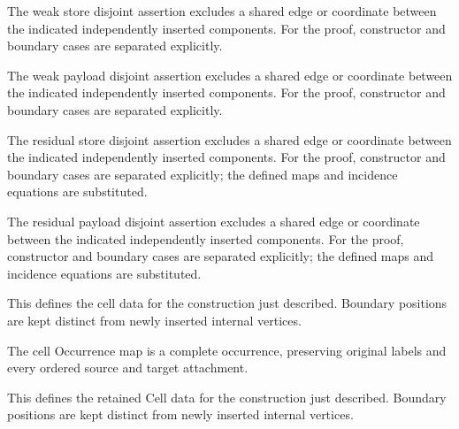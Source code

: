 The weak store disjoint assertion excludes a shared edge or coordinate between the indicated independently inserted components.
For the proof, constructor and boundary cases are separated explicitly.
\par{}

The weak payload disjoint assertion excludes a shared edge or coordinate between the indicated independently inserted components.
For the proof, constructor and boundary cases are separated explicitly.
\par{}

The residual store disjoint assertion excludes a shared edge or coordinate between the indicated independently inserted components.
For the proof, constructor and boundary cases are separated explicitly; the defined maps and incidence equations are substituted.
\par{}

The residual payload disjoint assertion excludes a shared edge or coordinate between the indicated independently inserted components.
For the proof, constructor and boundary cases are separated explicitly; the defined maps and incidence equations are substituted.
\par{}

This defines the cell data for the construction just described. Boundary positions are kept distinct from newly inserted internal vertices.
\par{}

The cell Occurrence map is a complete occurrence, preserving original labels and every ordered source and target attachment.
\par{}

This defines the retained Cell data for the construction just described. Boundary positions are kept distinct from newly inserted internal vertices.
\par{}

